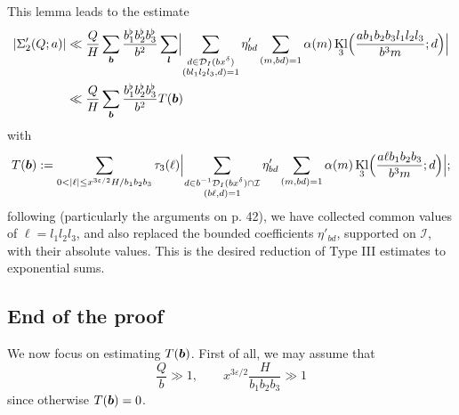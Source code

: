 \documentclass[12pt,a4paper,reqno]{amsart}
\numberwithin{equation}{section}
\DeclareMathOperator*\rad{rad}
\DeclareMathOperator{\hypk}{Kl}
\theoremstyle{plain}
\theoremstyle{definition}
\newcommand\eps{\varepsilon}
\newcommand{\DIone}[2]{\mathcal{D}_{{#1}}({#2})}
\newcommand{\uple}[1]{\text{\boldmath${#1}$}}
\def\stacksum#1#2{{\stackrel{{\scriptstyle #1}}
{{\scriptstyle #2}}}}
\newcommand{\ftd}{\mathcal{I}}
\renewcommand{\lessapprox}{\llcurly}
\begin{document}
This lemma leads to the estimate
\begin{align}
  |\Sigma'_2(Q;a)|&\ll \frac{Q}{H} \sum_{\uple{b}}
  \frac{b_1^{\flat}b_2^{\flat}b_3^{\flat}}{b^2} \sum_{\uple{l}}
  \Bigl|\sum_{\substack{d\in \DIone{I}{bx^\delta}\\(b l_1l_2l_3,d)=1}}
  \eta'_{bd} \sum_{(m,bd)=1} \alpha(m) \hypk_3\Bigl(
  \frac{ab_1b_2b_3l_1l_2l_3}{b^3m};d\Bigr)\Bigr|\nonumber\\
  &\ll \frac{Q}{H} \sum_{\uple{b}}
  \frac{b_1^{\flat}b_2^{\flat}b_3^{\flat}}{b^2}T(\uple{b})
\label{eq-tb}
\end{align}
with
$$
T(\uple{b}):= \sum_{0 < |\ell|\leq x^{3\eps/2}H/b_1b_2b_3} \tau_3(\ell)
\Bigl|\sum_{\substack{d\in b^{-1} \DIone{I}{bx^\delta}\cap \ftd\\(b
    \ell,d)=1}} \eta'_{bd} \sum_{(m,bd)=1} \alpha(m) \hypk_3\Bigl(
\frac{a\ell b_1b_2b_3}{b^3m};d\Bigr)\Bigr|;$$
following \cite{hb-d3} (particularly the arguments on p. 42), we have collected common values of $\ell=l_1l_2l_3$, and also
replaced the bounded coefficients $\eta'_{bd}$, supported on
$\ftd$, with their absolute values.  This is the desired reduction of
Type III estimates to exponential sums.


\subsection{End of the proof}

We now focus on estimating $T(\uple{b})$. First of all, we may assume
that
\begin{equation}\label{bqb}
\frac{Q}{b}\gg 1,\quad\quad x^{3\eps/2}\frac{H}{b_1b_2b_3}\gg 1
\end{equation}
since otherwise $T(\uple{b})=0$. 
\end{document}

